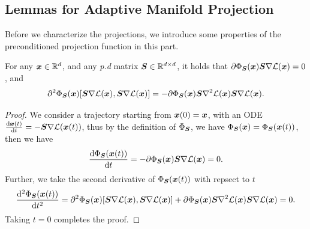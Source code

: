 \subsection{Lemmas for Adaptive Manifold Projection}\label{sec:lem-ada-man-proj}
Before we characterize the projections, we introduce some properties of the preconditioned projection function in this part.


\begin{lemma}\label{lmm:partial-phi-S-nabla-L}
    For any ${\bm{x}}\in\mathbb{R}^d$, and any \textit{p.d} matrix ${\bm{S}}\in\mathbb{R}^{d \times d}$, it holds that $\partial \Phi_{{\bm{S}}}({\bm{x}}){\bm{S}} \nabla \mathcal{L}({\bm{x}})=0$, and
    \begin{align*}
        \partial^2 \Phi_{{\bm{S}}}({\bm{x}})[{\bm{S}}\nabla \mathcal{L}({\bm{x}}),{\bm{S}}\nabla\mathcal{L}({\bm{x}})] = - \partial \Phi_{{\bm{S}}}({\bm{x}}) {\bm{S}} \nabla^2 \mathcal{L}({\bm{x}}) {\bm{S}} \nabla \mathcal{L}({\bm{x}}).
    \end{align*}
\end{lemma}
\begin{proof}
    We consider a trajectory starting from ${\bm{x}}(0)={\bm{x}}$, with an ODE $\frac{\mathrm{d} {\bm{x}}(t)}{\mathrm{d} t} = -{\bm{S}} \nabla \mathcal{L}({\bm{x}}(t))$, thus by the definition of $\Phi_{{\bm{S}}}$, we have $\Phi_{{\bm{S}}}({\bm{x}}) = \Phi_{{\bm{S}}}({\bm{x}}(t))$, then we have 
    \begin{align*}
        \frac{\mathrm{d} \Phi_{{\bm{S}}}({\bm{x}}(t))}{\mathrm{d} t} = - \partial \Phi_{{\bm{S}}}({\bm{x}}){\bm{S}} \nabla \mathcal{L}({\bm{x}})=0.
    \end{align*}
    Further, we take the second derivative of $\Phi_{{\bm{S}}}({\bm{x}}(t))$ with repsect to $t$
    \begin{align*}
        \frac{\mathrm{d}^2 \Phi_{{\bm{S}}}({\bm{x}}(t))}{\mathrm{d} t^2} =  \partial^2 \Phi_{{\bm{S}}}({\bm{x}})[{\bm{S}}\nabla \mathcal{L}({\bm{x}}),{\bm{S}}\nabla\mathcal{L}({\bm{x}})] + \partial \Phi_{{\bm{S}}}({\bm{x}}) {\bm{S}} \nabla^2 \mathcal{L}({\bm{x}}) {\bm{S}} \nabla \mathcal{L}({\bm{x}})=0.
    \end{align*}
    Taking $t=0$ completes the proof.
\end{proof}

